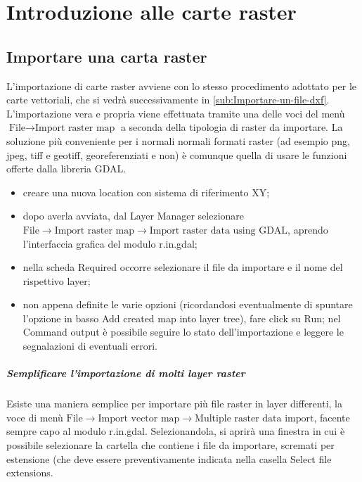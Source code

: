 \chapter{Introduzione alle carte raster}

\section{Importare una carta raster\label{sec:Importare-una-carta}}
	L'importazione di carte raster avviene con lo stesso procedimento adottato per le carte vettoriali, che si vedrà successivamente in \textsection\ref{sub:Importare-un-file-dxf}. L'importazione vera e propria viene effettuata tramite una delle voci del menù \textsf{$\text{File}\rightarrow\text{Import~raster~map}$} a seconda della tipologia di raster da importare. La soluzione più conveniente per i normali normali formati raster (ad esempio png, jpeg, tiff e geotiff, georeferenziati e non) è comunque quella di usare le funzioni offerte dalla libreria GDAL.

	\begin{itemize}
		\item creare una nuova location con sistema di riferimento XY;
		\item dopo averla avviata, dal Layer Manager selezionare \textsf{$\text{File}\rightarrow\text{Import~raster~map}\rightarrow\text{Import~raster~data~using~GDAL}$}, aprendo l'interfaccia grafica del modulo \textsf{r.in.gdal};
		\item nella scheda \textsf{Required} occorre selezionare il file da importare e il nome del rispettivo layer;
		\item non appena definite le varie opzioni (ricordandosi eventualmente di spuntare l'opzione in basso \textsf{Add created map into layer tree}), fare click su \textsf{Run}; nel \textsf{Command output} è possibile seguire lo stato dell'importazione e leggere le segnalazioni di eventuali errori.
	\end{itemize}

			\paragraph{Semplificare l'importazione di molti layer raster}
				Esiste una maniera semplice per importare più file raster in layer differenti, la voce di menù \textsf{$\text{File}\rightarrow\text{Import~vector~map}\rightarrow\text{Multiple~raster~data~import}$}, facente sempre capo al modulo \textsf{r.in.gdal}. Selezionandola, si aprirà una finestra in cui è possibile selezionare la cartella che contiene i file da importare, scremati per estensione (che deve essere preventivamente indicata nella casella \textsf{Select file extensions}.

